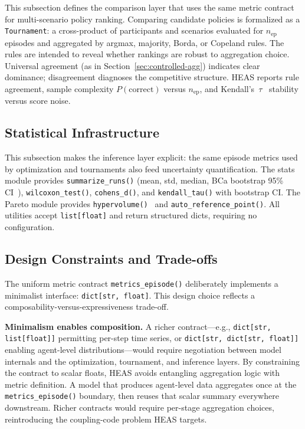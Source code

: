 \documentclass{wscpaperproc}
\begin{document}
This subsection defines the comparison layer that uses the same metric contract
for multi-scenario policy ranking. Comparing candidate policies is formalized as a \texttt{Tournament}: a
cross-product of participants and scenarios evaluated for $n_\text{ep}$
episodes and aggregated by argmax, majority, Borda, or Copeland rules. The
rules are intended to reveal whether rankings are robust to aggregation choice.
Universal agreement (as in Section~\ref{sec:controlled-agg}) indicates clear dominance;
disagreement diagnoses the competitive structure.
HEAS reports rule agreement, sample complexity $P(\text{correct})$ versus
$n_\text{ep}$, and Kendall's~$\tau$~\cite{kendall1938new} stability versus
score noise.

\subsection{Statistical Infrastructure}

This subsection makes the inference layer explicit: the same episode metrics
used by optimization and tournaments also feed uncertainty quantification.
The stats module provides \texttt{summarize\_runs()} (mean, std, median, BCa
bootstrap 95\% CI~\cite{efron1994bootstrap}), \texttt{wilcoxon\_test()},
\texttt{cohens\_d()}, and \texttt{kendall\_tau()} with bootstrap CI.
The Pareto module provides \texttt{hypervolume()}~\cite{zitzler1998hypervolume}
and \texttt{auto\_reference\_point()}. All utilities accept \texttt{list[float]}
and return structured dicts, requiring no configuration.

\subsection{Design Constraints and Trade-offs}
\label{sec:design-constraints}

The uniform metric contract \texttt{metrics\_episode()} deliberately implements
a minimalist interface: \texttt{dict[str, float]}. This design choice reflects a
composability-versus-expressiveness trade-off.

\textbf{Minimalism enables composition.} A richer contract---e.g.,
\texttt{dict[str, list[float]]} permitting per-step time series, or
\texttt{dict[str, dict[str, float]]} enabling agent-level distributions---would
require negotiation between model internals and the optimization, tournament, and
inference layers. By constraining the contract to scalar floats, HEAS avoids
entangling aggregation logic with metric definition. A model that produces
agent-level data aggregates once at the \texttt{metrics\_episode()} boundary, then
reuses that scalar summary everywhere downstream. Richer contracts would require
per-stage aggregation choices, reintroducing the coupling-code problem HEAS targets.
\end{document}
